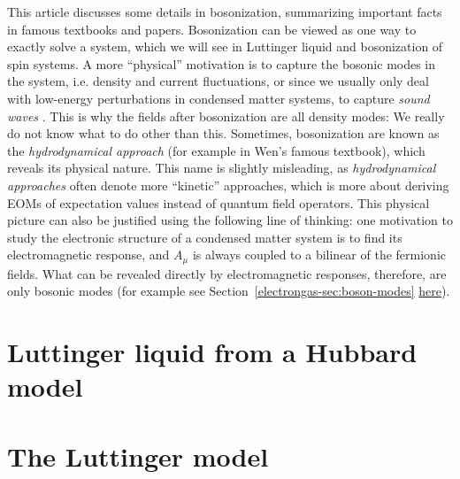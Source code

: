 \documentclass[hyperref, a4paper]{article}
\begin{document}
This article discusses some details in bosonization, summarizing important facts in famous textbooks and papers.
Bosonization can be viewed as one way to exactly solve a system, which we will see in Luttinger liquid and
bosonization of spin systems. A more ``physical'' motivation is to capture the bosonic modes in the system,
i.e. density and current fluctuations, or since we usually only deal with low-energy perturbations in 
condensed matter systems, to capture \emph{sound waves} \cite{Tomonaga1950RemarksOB,10.1143/PTPS.170.185}. 
This is why the fields after bosonization are all density modes: We really do not know what to do other than
this. Sometimes, bosonization are known as the \emph{hydrodynamical approach} (for example in Wen's famous 
textbook), which reveals its physical nature. This name is slightly misleading, as \emph{hydrodynamical approaches}
often denote more ``kinetic'' approaches, which is more about deriving EOMs of expectation values instead of 
quantum field operators. This physical picture can also be justified using the following line of thinking: 
one motivation to study the electronic structure of a condensed matter system is to find its electromagnetic 
response, and $A_\mu$ is always coupled to a bilinear of the fermionic fields. What can be revealed directly 
by electromagnetic responses, therefore, are only bosonic modes (for example see Section~\ref{electrongas-sec:boson-modes} \href{../band-metal-insulator/electron-gas.pdf}{here}).

\section{Luttinger liquid from a Hubbard model}


\section{The Luttinger model}


 
\end{document}
